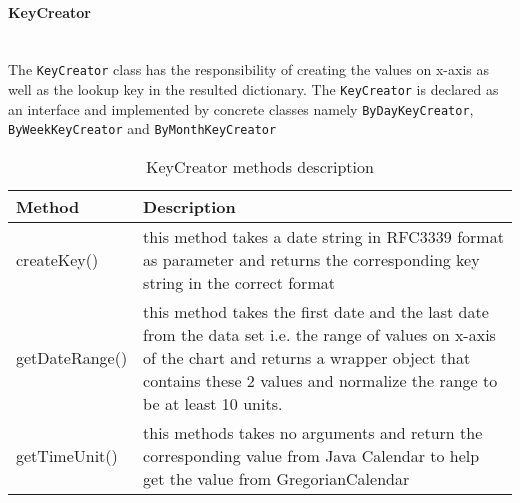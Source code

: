 \paragraph{KeyCreator}\mbox{} \\
The \texttt{KeyCreator} class has the responsibility of creating the values on x-axis as well as the lookup key in the
resulted dictionary. The \texttt{KeyCreator} is declared as an interface and implemented by concrete classes namely
\texttt{ByDayKeyCreator}, \texttt{ByWeekKeyCreator} and \texttt{ByMonthKeyCreator}


\begin{table}
\begin{center}
    \begin{tabularx}{\textwidth}{| l | X |}
        \hline Method & Description \\
        \hline createKey() & 
            this method takes a date string in RFC3339 format as parameter and returns the corresponding key string in
            the correct format \\
        \hline getDateRange() &
            this method takes the first date and the last date from the data set i.e. the range of values on x-axis of
            the chart and returns a wrapper object that contains these 2 values and normalize the range to be at least
            10 units. \\
        \hline getTimeUnit() &
            this methods takes no arguments and return the corresponding value from Java Calendar to help get the value
            from GregorianCalendar \\
        \hline
    \end{tabularx}
\end{center}
    \caption{KeyCreator methods description}
\end{table}


